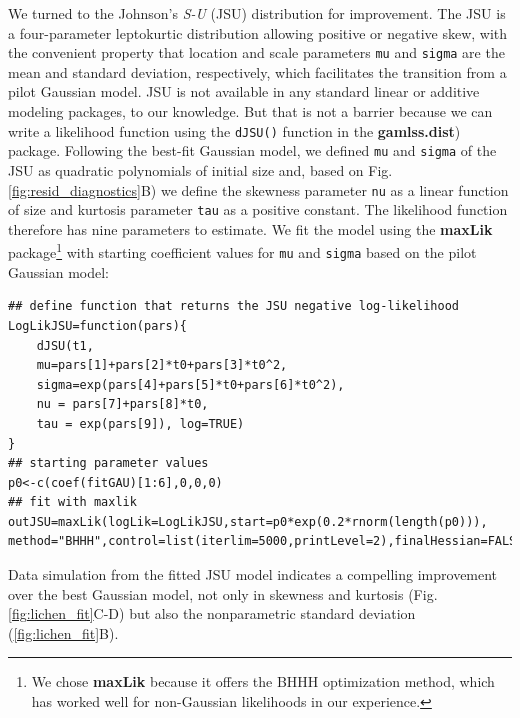 \documentclass[12pt]{article}
\begin{document}
We turned to the Johnson's \emph{S-U} (JSU) distribution for improvement. 
The JSU is a four-parameter leptokurtic distribution allowing positive or negative skew, with the convenient property that location and scale parameters \texttt{mu} and \texttt{sigma} are the mean and standard deviation, respectively, which facilitates the transition from a pilot Gaussian model. 
JSU is not available in any standard linear or additive modeling packages, to our knowledge. But that is not a barrier because we can write a likelihood function using the \texttt{dJSU()} function in the \textbf{gamlss.dist}) package. 
Following the best-fit Gaussian model, we defined \texttt{mu} and \texttt{sigma} of the JSU as quadratic polynomials of initial size and, based on Fig. \ref{fig:resid_diagnostics}B) we define the skewness parameter \texttt{nu} as a linear function of size and kurtosis parameter \texttt{tau} as a positive constant. The likelihood function therefore has nine parameters to estimate.
We fit the model using the \textbf{maxLik} package\footnote{We chose \textbf{maxLik} because it offers the BHHH optimization method, which has worked well for non-Gaussian likelihoods in our experience.} with starting coefficient values for \texttt{mu} and \texttt{sigma} based on the pilot Gaussian model:
\begin{lstlisting}
## define function that returns the JSU negative log-likelihood
LogLikJSU=function(pars){
	dJSU(t1, 
	mu=pars[1]+pars[2]*t0+pars[3]*t0^2,
	sigma=exp(pars[4]+pars[5]*t0+pars[6]*t0^2),
	nu = pars[7]+pars[8]*t0,
	tau = exp(pars[9]), log=TRUE)
}
## starting parameter values
p0<-c(coef(fitGAU)[1:6],0,0,0)
## fit with maxlik
outJSU=maxLik(logLik=LogLikJSU,start=p0*exp(0.2*rnorm(length(p0))),
method="BHHH",control=list(iterlim=5000,printLevel=2),finalHessian=FALSE); 
\end{lstlisting}
Data simulation from the fitted JSU model indicates a compelling improvement over the best Gaussian model, not only in skewness and kurtosis (Fig. \ref{fig:lichen_fit}C-D) but also the nonparametric standard deviation (\ref{fig:lichen_fit}B). 
\end{document}
